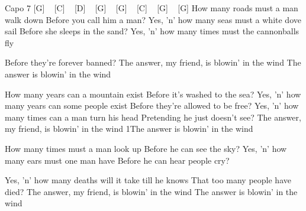 
Capo 7
[G] ~ [C] ~ [D] ~ [G] ~ [G] ~ [C] ~ [G] ~ [G]
How many roads must a man walk down
Before you call him a man?
Yes, ’n’ how many seas must a white dove sail
Before she sleeps in the sand?
Yes, ’n’ how many times must the cannonballs fly

Before they’re forever banned?
The answer, my friend, is blowin’ in the wind
The answer is blowin’ in the wind

How many years can a mountain exist
Before it’s washed to the sea?
Yes, ’n’ how many years can some people exist
Before they’re allowed to be free?
Yes, ’n’ how many times can a man turn his head
Pretending he just doesn’t see?
The answer, my friend, is blowin’ in the wind
1The answer is blowin’ in the wind

How many times must a man look up
Before he can see the sky?
Yes, ’n’ how many ears must one man have
Before he can hear people cry?

Yes, ’n’ how many deaths will it take till he knows
That too many people have died?
The answer, my friend, is blowin’ in the wind
The answer is blowin’ in the wind 